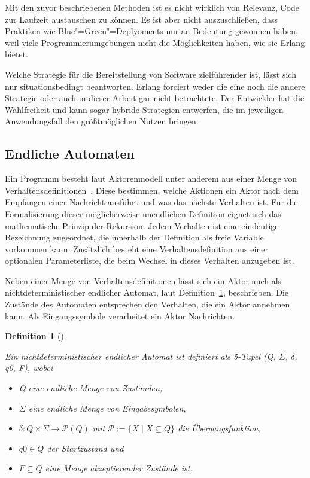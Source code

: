 Mit den zuvor beschriebenen Methoden ist es nicht wirklich von Relevanz, Code zur Laufzeit austauschen zu können. Es ist aber nicht auszuschließen, dass Praktiken wie Blue"=Green"=Deplyoments \usw nur an Bedeutung gewonnen haben, weil viele Programmierumgebungen nicht die Möglichkeiten haben, wie sie Erlang bietet.

Welche Strategie für die Bereitstellung von Software zielführender ist, lässt sich nur situationsbedingt beantworten. Erlang forciert weder die eine noch die andere Strategie oder auch in dieser Arbeit gar nicht betrachtete. Der Entwickler hat die Wahlfreiheit und kann sogar hybride Strategien entwerfen, die im jeweiligen Anwendungsfall den größtmöglichen Nutzen bringen.

\subsection{Endliche Automaten}

Ein Programm besteht laut Aktorenmodell unter anderem aus einer Menge von Verhaltensdefinitionen~\cite[30]{Agha:1986:AMC:7929}. Diese bestimmen, welche Aktionen ein Aktor nach dem Empfangen einer Nachricht ausführt und was das nächste Verhalten ist. Für die Formalisierung dieser möglicherweise unendlichen Definition eignet sich das mathematische Prinzip der Rekursion. Jedem Verhalten ist eine eindeutige Bezeichnung zugeordnet, die innerhalb der Definition als freie Variable vorkommen kann. Zusätzlich besteht eine Verhaltensdefinition aus einer optionalen Parameterliste, die beim Wechsel in dieses Verhalten anzugeben ist.

Neben einer Menge von Verhaltensdefinitionen lässt sich ein Aktor auch als nichtdeterministischer endlicher Automat, laut Definition~\ref{def:nfs}, beschrieben. Die Zustände des Automaten entsprechen den Verhalten, die ein Aktor annehmen kann. Als Eingangssymbole verarbeitet ein Aktor Nachrichten.

\newtheorem{nfstheorem}{Definition}[section]

\begin{nfstheorem}[{{\cite[85]{hopcroft2003}}}]
\label{def:nfs}

Ein nichtdeterministischer endlicher Automat ist definiert als 5-Tupel (Q, $\Sigma$, $\delta$, q0, F), wobei

\begin{itemize}
	\item Q eine endliche Menge von Zuständen,
	\item $\Sigma$ eine endliche Menge von Eingabesymbolen,
	\item $\delta : Q \times \Sigma \rightarrow \mathcal{P}(Q)$ mit $\mathcal{P} := \{ X \mid X \subseteq Q \}$ die Übergangsfunktion,
	\item $q0 \in Q$ der Startzustand und
	\item $F \subseteq Q$ eine Menge akzeptierender Zustände ist.
\end{itemize}

\end{nfstheorem}


